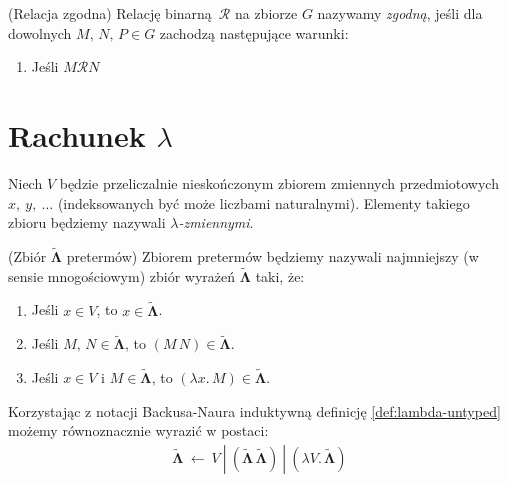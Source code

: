 \begin{definicja}(Relacja zgodna)
  Relację binarną \(\mathcal{R}\) na zbiorze \(G\) nazywamy \emph{zgodną}, jeśli dla dowolnych \(M,\,N,\,P \in G\) zachodzą następujące warunki:
  \begin{enumerate}[label={(\alph*)}, ref={(\arabic*)}]
    \setlength\itemsep{0em}
    \item Jeśli \(M \mathcal{R} N\)  
  \end{enumerate}
\end{definicja}

\section{Rachunek \(\lambda\)}
Niech  \(V\) będzie przeliczalnie nieskończonym zbiorem zmiennych przedmiotowych \(x,\ y,\ \dots\) (indeksowanych być może liczbami naturalnymi). Elementy takiego zbioru będziemy nazywali \emph{\(\lambda\)-zmiennymi}.

\begin{definicja}(Zbiór \(\mathbf{\tilde\Lambda}\) pretermów)
Zbiorem pretermów będziemy nazywali najmniejszy (w sensie mnogościowym) zbiór wyrażeń \(\mathbf{\tilde\Lambda}\) taki, że:
  \begin{enumerate}[label={(P\arabic*)}, ref={(P\arabic*)}]
  \setlength\itemsep{0em}
  \item Jeśli \(x \in V\), to \(x\in\mathbf{\tilde\Lambda}\).\label{pret1}
  \item Jeśli \(M,\,N\in \mathbf{\tilde\Lambda}\), to \((M\,N)\in\mathbf{\tilde\Lambda}\).\label{pret2}
  \item Jeśli \(x\in V\) i \(M\in\mathbf{\tilde\Lambda}\), to \((\lambda x.\,M)\in\mathbf{\tilde\Lambda}\).\label{pret3}
  \end{enumerate}
\end{definicja}\label{def:lambda-untyped}
Korzystając z notacji Backusa-Naura induktywną definicję \ref{def:lambda-untyped} możemy równoznacznie wyrazić w postaci:
\begin{align*}
  \mathbf{\tilde\Lambda}\ \leftarrow \ V\ |\ (\mathbf{\tilde\Lambda}\,\mathbf{\tilde\Lambda}) \ |\ (\lambda V.\, \mathbf{\tilde\Lambda})
\end{align*}

